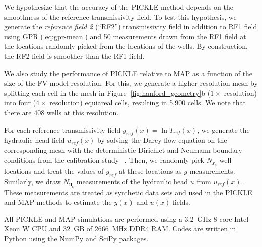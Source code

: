 \documentclass{agujournal2019}
\begin{document}
We hypothesize that the accuracy of the PICKLE method depends on the smoothness of the reference transmissivity field. To test this hypothesis, we generate the \emph{reference field 2} (``RF2'') transmissivity field in addition to RF1 field using GPR (\cref{eq:gpr-mean}) and
50 measurements drawn from the RF1 field at the locations randomly picked from the locations of the wells. By construction, the RF2 field is smoother than the RF1 field. 

We also study the performance of PICKLE relative to MAP as a function of the size of the FV model resolution.
For this, we generate a higher-resolution mesh by splitting each cell in the mesh in Figure~\ref{fig:hanford_geometry}b ($1\times$ resolution) into four ($4\times$ resolution) equiareal cells, resulting in 5,900 cells.  We note that there are  $408$ wells at this resolution. 



For each reference transmissivity field $y_{ref}(x) = \ln T_{ref}(x)$,  we generate the hydraulic head field $u_{ref}(x)$ by solving the Darcy flow equation on the corresponding mesh with the deterministic Dirichlet and Neumann boundary conditions from the calibration study ~\citep{cole2001transient}.
Then, we randomly pick $N_{\mathbf{y}_{\mathrm{s}}}$ well locations and treat the values of $y_{ref}$ at these locations as $y$ measurements.
Similarly, we draw $N_{\mathbf{u}_{\mathrm{s}}}$ measurements of the hydraulic head $u$ from $u_{ref}(x)$. These measurements are treated as synthetic data sets and used in the PICKLE and MAP methods to estimate the $y(x)$ and $u(x)$ fields.   

All PICKLE and MAP simulations are performed using a 3.2~GHz 8-core Intel Xeon W CPU and 32~GB of 2666~MHz DDR4 RAM. Codes are written in Python using the NumPy and SciPy packages.
\end{document}
